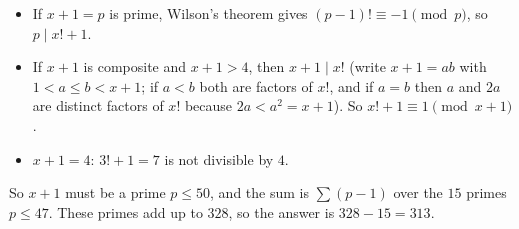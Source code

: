 \begin{itemize}
\item If $x+1=p$ is prime, Wilson's theorem gives $(p-1)!\equiv-1\pmod p$, so $p\mid x!+1$.
\item If $x+1$ is composite and $x+1>4$, then $x+1\mid x!$ (write $x+1=ab$ with $1<a\le b<x+1$; if $a<b$ both are factors of $x!$, and if $a=b$ then $a$ and $2a$ are distinct factors of $x!$ because $2a<a^2=x+1$). So $x!+1\equiv1\pmod{x+1}$.
\item $x+1=4$: $3!+1=7$ is not divisible by $4$.
\end{itemize}
So $x+1$ must be a prime $p\le50$, and the sum is $\sum(p-1)$ over the $15$ primes $p\le47$. These primes add up to $328$, so the answer is $328-15=\boxed{313}$.
